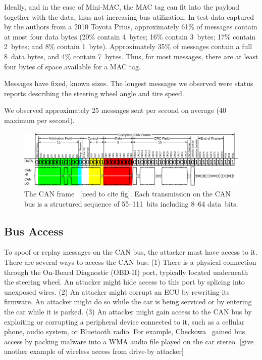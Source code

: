 Ideally, and in the case of Mini-MAC, the MAC tag
can fit into the payload together with the data, thus not increasing bus utilization. 
In test data captured by the authors from a 2010 Toyota Prius, 
approximately 61\% of messages contain at most four data bytes
(20\% contain 4~bytes; 16\% contain 3~bytes; 17\% contain 2~bytes; and 8\% contain 1~byte).
Approximately 35\% of messages contain a full 8~data bytes, and 4\% contain 7~bytes.
Thus, for most messages, there are at least four bytes of space available for a MAC tag.

Messages have fixed, known sizes.  The longest messages we observed were 
status reports describing the steering wheel angle and tire speed.

We observed approximately 25 messages sent per second on average (40 maximum per second).


	\begin{figure}
		\centering
		\includegraphics[width=\linewidth]{figures/can_frame.png}
		\caption{The CAN frame~\cite{?} [need to cite fig].  
		Each transmission on the CAN bus is a structured sequence of 55--111~bits including 8--64 data~bits.}
		\label{fig-frame}
	\end{figure}

\subsection{Bus Access}

To spoof or replay messages on the CAN bus, the attacker must have access to it.
There are several ways to access the CAN bus:  (1) There is a
physical connection through the On-Board Diagnostic (OBD-II) port, 
typically located underneath the steering wheel.  An attacker might hide
access to this port by splicing into unexposed wires.
(2) An attacker might corrupt an ECU by rewriting its firmware. An attacker might
do so while the car is being serviced or by entering the car while it is parked.
(3) An attacker might gain access to the CAN bus by exploiting or corrupting a peripheral
device connected to it, such as a cellular phone, audio system, or Bluetooth
radio.  For example, Checkowa~\cite{Checkoway-2011} gained bus access by packing 
malware into a WMA audio file played on the car stereo. [give another example
of wireless access from drive-by attacker]

